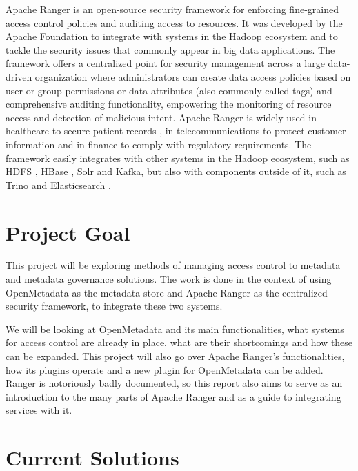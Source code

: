 Apache Ranger \cite{apacheRangerAccessControlModelGuptaMaanak2017,apacheRangerMultiLayerdGuptaMaanak2017} is an open-source security framework for enforcing fine-grained access control policies and auditing access to resources. It was developed by the Apache Foundation to integrate with systems in the Hadoop ecosystem and to tackle the security issues that commonly appear in big data applications. The framework offers a centralized point for security management across a large data-driven organization where administrators can create data access policies based on user or group permissions or data attributes (also commonly called tags) and comprehensive auditing functionality, empowering the monitoring of resource access and detection of malicious intent. Apache Ranger is widely used in healthcare 
to secure patient records \cite{rangerHealhcareRangarajan2018}, in telecommunications to protect customer information \cite{rangerTelecomAhmad2019} and in finance to comply with regulatory requirements. The framework easily integrates with other systems in the Hadoop ecosystem, such as HDFS \cite{HDFSBorthakur2008}, HBase \cite{apacheHbaseTech}, Solr \cite{apacheSolrTech} and Kafka, but also with components outside of it, such as Trino and Elasticsearch \cite{elasticsearchTech}.

\section{\label{sec:project_goal} Project Goal}

This project will be exploring methods of managing access control to metadata and metadata governance solutions. The work is done in the context of using OpenMetadata as the metadata store and Apache Ranger as the centralized security framework, to integrate these two systems.

We will be looking at OpenMetadata and its main functionalities, what systems for access control are already in place, what are their shortcomings and how these can be expanded. This project will also go over Apache Ranger's functionalities, how its plugins operate and a new plugin for OpenMetadata can be added. Ranger is notoriously badly documented, so this report also aims to serve as an introduction to the many parts of Apache Ranger and as a guide to integrating services with it.

\section{Current Solutions}

